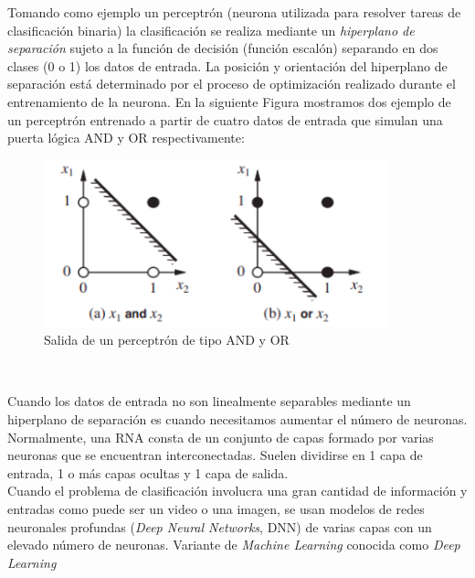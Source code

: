 Tomando como ejemplo un perceptrón (neurona utilizada para resolver tareas de clasificación binaria) la clasificación se realiza mediante un \textit{hiperplano de separación} sujeto a la función de decisión (función escalón) separando en dos clases (0 o 1) los datos de entrada. La posición y orientación del hiperplano de separación está determinado por el proceso de optimización realizado durante el entrenamiento de la neurona. En la siguiente Figura mostramos dos ejemplo de un perceptrón entrenado a partir de cuatro datos de entrada que simulan una puerta lógica AND y OR respectivamente:\\

\begin{figure}[H]
  \begin{center}
    \includegraphics[width=10cm]{imagenes/cap1/ejemplo-perceptron.png}
  \end{center}
  \caption[Salida de un perceptrón de tipo AND y OR]{Salida de un perceptrón de tipo AND y OR \cite{AIMA}}
  \label{fig:salida_perceptron}
\end{figure}\

Cuando los datos de entrada no son linealmente separables mediante un hiperplano de separación es cuando necesitamos aumentar el número de neuronas. Normalmente, una RNA consta de un conjunto de capas formado por varias neuronas que se encuentran interconectadas. Suelen dividirse en 1 capa de entrada, 1 o más capas ocultas y 1 capa de salida.\\

Cuando el problema de clasificación involucra una gran cantidad de información y entradas como puede ser un video o una imagen, se usan modelos de redes neuronales profundas (\textit{Deep Neural Networks}, DNN) de varias capas con un elevado número de neuronas. Variante de \textit{Machine Learning} conocida como \textit{Deep Learning}\\

